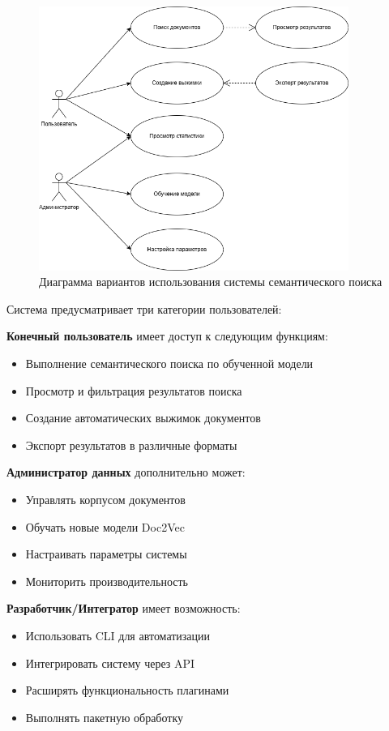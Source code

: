 \begin{figure}[H]
	\centering
	\includegraphics[width=0.9\textwidth]{images/USE_CASE.png}
	\caption{Диаграмма вариантов использования системы семантического поиска}
	\label{usecase}
\end{figure}

Система предусматривает три категории пользователей:

\textbf{Конечный пользователь} имеет доступ к следующим функциям:
\begin{itemize}
	\item Выполнение семантического поиска по обученной модели
	\item Просмотр и фильтрация результатов поиска
	\item Создание автоматических выжимок документов
	\item Экспорт результатов в различные форматы
\end{itemize}

\textbf{Администратор данных} дополнительно может:
\begin{itemize}
	\item Управлять корпусом документов
	\item Обучать новые модели Doc2Vec
	\item Настраивать параметры системы
	\item Мониторить производительность
\end{itemize}

\textbf{Разработчик/Интегратор} имеет возможность:
\begin{itemize}
	\item Использовать CLI для автоматизации
	\item Интегрировать систему через API
	\item Расширять функциональность плагинами
	\item Выполнять пакетную обработку
\end{itemize}

